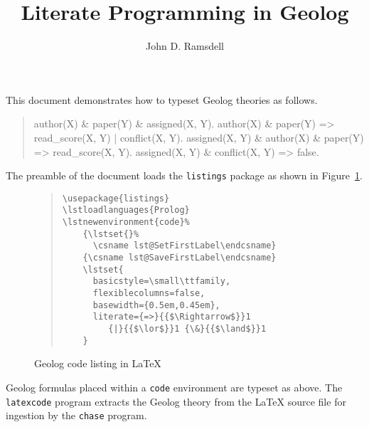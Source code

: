 \documentclass[12pt]{article}
\title{Literate Programming in Geolog}
\author{John D. Ramsdell}
\begin{document}
\maketitle

This document demonstrates how to typeset Geolog theories as follows.
\begin{quote}
  \begin{code}
author(X) & paper(Y) & assigned(X, Y).
author(X) & paper(Y) => read_score(X, Y) | conflict(X, Y).
assigned(X, Y) & author(X) & paper(Y) => read_score(X, Y).
assigned(X, Y) & conflict(X, Y) => false.
  \end{code}
\end{quote}

The preamble of the document loads the \texttt{listings} package as
shown in Figure~\ref{fig:code}.

\begin{figure}[h]
  \begin{quote}
    \begin{verbatim}
\usepackage{listings}
\lstloadlanguages{Prolog}
\lstnewenvironment{code}%
    {\lstset{}%
      \csname lst@SetFirstLabel\endcsname}
    {\csname lst@SaveFirstLabel\endcsname}
    \lstset{
      basicstyle=\small\ttfamily,
      flexiblecolumns=false,
      basewidth={0.5em,0.45em},
      literate={=>}{{$\Rightarrow$}}1
         {|}{{$\lor$}}1 {\&}{{$\land$}}1
    }
\end{verbatim}
  \end{quote}
  \caption{Geolog code listing in \LaTeX}\label{fig:code}
\end{figure}

Geolog formulas placed within a \texttt{code} environment are typeset as
above.  The \texttt{latexcode} program extracts the Geolog theory from
the {\LaTeX} source file for ingestion by the \texttt{chase} program.
\end{document}
